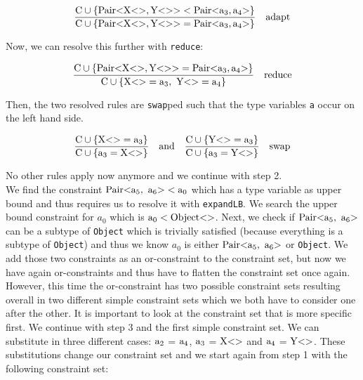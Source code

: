 \begin{align*}
    \frac{\text{C} \cup \{ \text{Pair} \text{<} \text{X} \text{<}  \text{>}, \text{Y} \text{<}  \text{>} \text{>} < \text{Pair} \text{<} \text{a}_{3}, \text{a}_{4} \text{>} \} }{\text{C} \cup \{ \text{Pair} \text{<} \text{X} \text{<}  \text{>}, \text{Y} \text{<}  \text{>} \text{>} = \text{Pair} \text{<} \text{a}_{3}, \text{a}_{4} \text{>} \} } \quad \text{adapt}
\end{align*}

Now, we can resolve this further with \verb|reduce|:

\begin{align*}
    \frac{\cand \{ \nvtt{Pair}{\nvtt{X}{}, \nvtt{Y}{}} = \nvtt{Pair}{\fa{3}, \fa{4}} \} }{\cand \{ \nvtt{X}{} = \fa{3}, \ \nvtt{Y}{} = \fa{4} \} } \quad \text{reduce}
\end{align*}

Then, the two resolved rules are \verb|swap|ped such that the type variables \verb|a| occur on the left hand side.

\begin{align*}
    \frac{\text{C} \cup \{ \text{X} \text{<}  \text{>} = \text{a}_{3} \} }{\text{C} \cup \{ \text{a}_{3} = \text{X} \text{<}  \text{>} \} } \quad \text{and} \quad \frac{\text{C} \cup \{ \text{Y} \text{<}  \text{>} = \text{a}_{3} \} }{\text{C} \cup \{ \text{a}_{3} = \text{Y} \text{<}  \text{>} \} } \quad \text{swap}
\end{align*}

No other rules apply now anymore and we continue with step 2.\\

We find the constraint $\nvtt{Pair}{\fa{5}, \ \fa{6}} < \fa{0}$ which has a type variable as upper bound and thus requires us to resolve it with \verb|expandLB|. We search the upper bound constraint for $a_0$ which is $\text{a}_{0} < \text{Object} \text{<}  \text{>}$.
Next, we check if $\nvtt{Pair}{\fa{5}, \ \fa{6}}$ can be a subtype of \verb|Object| which is trivially satisfied (because everything is a subtype of \verb|Object|) and thus we know $a_0$ is either $\nvtt{Pair}{\fa{5}, \ \fa{6}}$ or \verb|Object|. We add those two constraints as an or-constraint
to the constraint set, but now we have again or-constraints and thus have to flatten the constraint set once again. However, this time the or-constraint has two possible constraint sets resulting overall in two different simple constraint sets which we both have to consider one after the other.
It is important to look at the constraint set that is more specific first. We continue with step 3 and the first simple constraint set. We can substitute in three different cases: $\text{a}_{2}$ = $\text{a}_{4}$, $\text{a}_{3}$ = $\text{X} \text{<}  \text{>}$ and $\text{a}_{4}$ = $\text{Y} \text{<}  \text{>}$.
These substitutions change our constraint set and we start again from step 1 with the following constraint set:

